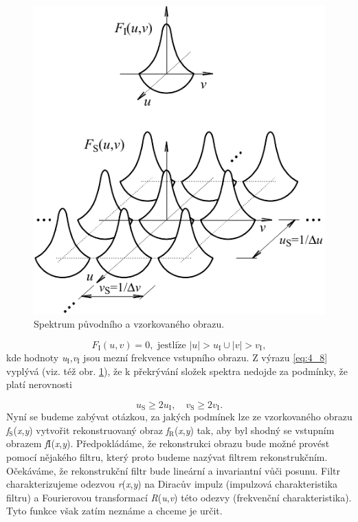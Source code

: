\begin{figure}[th]
    \begin{center}
        \includegraphics[scale=1.0]{04_digitalizace/images/img_4_2.pdf}
    \end{center}
    \caption{Spektrum původního a vzorkovaného obrazu.}
    \label{img:4_2}
\end{figure}

\begin{equation} \label{eq:4_9}
    F_\mathrm{I}(u, v) = 0, \,\, \mathrm{jestli\check{z}e} \,\, |u| > u_\mathrm{I} \cup |v| > v_\mathrm{I},
\end{equation}
kde hodnoty \textit{u}$_\mathrm{I}$,\textit{v}$_\mathrm{I}$ jsou mezní frekvence vstupního obrazu. Z výrazu \eqref{eq:4_8} vyplývá (viz. též obr. \ref{img:4_2}), že k překrývání složek spektra nedojde za podmínky, že platí nerovnosti

\begin{equation} \label{eq:4_10}
    u_\mathrm{S} \geq 2 u_\mathrm{I}, \quad v_\mathrm{S} \geq 2 v_\mathrm{I}.
\end{equation}
Nyní se budeme zabývat otázkou, za jakých podmínek lze ze vzorkovaného obrazu \textit{f}$_\mathrm{S}$(\textit{x},\textit{y}) vytvořit rekonstruovaný obraz \textit{f}$_\mathrm{R}$(\textit{x},\textit{y}) tak, aby byl shodný se vstupním obrazem \textit{f}I(\textit{x},\textit{y}). Předpokládáme, že rekonstrukci obrazu bude možné provést pomocí nějakého filtru, který proto budeme nazývat filtrem rekonstrukčním. Očekáváme, že rekonstrukční filtr bude lineární a invariantní vůči posunu. Filtr charakterizujeme odezvou \textit{r}(\textit{x},\textit{y}) na Diracův impulz (impulzová charakteristika filtru) a Fourierovou transformací \textit{R}(\textit{u},\textit{v}) této odezvy (frekvenční charakteristika). Tyto funkce však zatím neznáme a chceme je určit.

